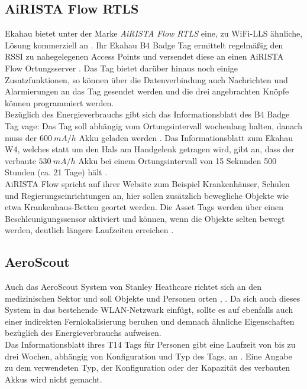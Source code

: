 \subsection{AiRISTA Flow RTLS}
Ekahau bietet unter der Marke \textit{AiRISTA Flow RTLS} eine, zu WiFi-LLS ähnliche, Lösung kommerziell an \cite{airista2017airista}.
Ihr Ekahau B4 Badge Tag ermittelt regelmäßig den RSSI zu nahegelegenen Access Points und versendet diese an einen AiRISTA Flow Ortungsserver \cite{liu2007survey}.
Das Tag bietet darüber hinaus noch einige Zusatzfunktionen, so können über die Datenverbindung auch Nachrichten und Alarmierungen an das Tag gesendet werden und die drei angebrachten Knöpfe können programmiert werden.\\
Bezüglich des Energieverbrauchs gibt sich das Informationsblatt des B4 Badge Tag vage: Das Tag soll abhängig vom Ortungsintervall wochenlang halten, danach muss der $600\ mA/h$ Akku geladen werden \cite{ekahau2017b4}.
Das Informationsblatt zum Ekahau W4, welches statt um den Hals am Handgelenk getragen wird, gibt an, dass der verbaute $530\ mA/h$ Akku bei einem Ortungsintervall von 15 Sekunden 500 Stunden (ca. 21 Tage) hält \cite{ekahau2017w4}.\\
AiRISTA Flow spricht auf ihrer Website zum Beispiel Krankenhäuser, Schulen und Regierungseinrichtungen an, hier sollen zusätzlich bewegliche Objekte wie etwa Krankenhaus-Betten geortet werden.
Die Asset Tags werden über einen Beschleunigungssensor aktiviert und können, wenn die Objekte selten bewegt werden, deutlich längere Laufzeiten erreichen \cite{ekahau2017a4}. \\

\subsection{AeroScout}
Auch das AeroScout System von Stanley Heathcare richtet sich an den medizinischen Sektor und soll Objekte und Personen orten \cite{aeroscout2017asset}, \cite{aeroscout2017staff}.
Da  sich auch dieses System in das bestehende WLAN-Netzwark einfügt, sollte es auf ebenfalls auch einer indirekten Fernlokalisierung beruhen und demnach ähnliche Eigenschaften bezüglich des Energieverbrauchs aufweisen.\\
Das Informationsblatt ihres T14 Tags für Personen gibt eine Laufzeit von bis zu drei Wochen, abhängig von Konfiguration und Typ des Tags, an \cite{aeroscout2017t14}. 
Eine Angabe zu dem verwendeten Typ, der Konfiguration oder der Kapazität des verbauten Akkus wird nicht gemacht.\\

